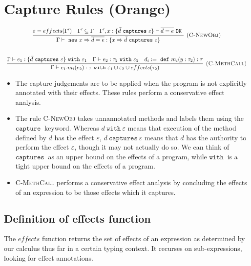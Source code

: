 \documentclass{article}
\newcommand{\keywadj}[1]{\mathtt{#1}}
\newcommand{\keyw}[1]{\keywadj{#1}~}
\begin{document}
\section{Capture Rules (Orange)}

\[
\begin{array}{c}

\infer[\textsc{(C-NewObj)}]
	{\Gamma \vdash~\keywadj{new}~x \Rightarrow \overline{d = e} : \{ x \Rightarrow \bar d~\keyw{captures} \varepsilon \} }
	{\varepsilon = effects(\Gamma') & \Gamma' \subseteq \Gamma & \Gamma', x : \{ \bar d~\keyw {captures} \varepsilon \} \vdash \overline{d = e}~\keyw{OK}} \\[5ex]

\infer[\textsc{(C-MethCall)}]
	{\Gamma \vdash e_1.m_i(e_2) : \tau~ \keyw{with} \varepsilon_1 \cup \varepsilon_2 \cup effects(\tau_2)}
	{\Gamma \vdash e_1 : \{ \bar d~\keyw{captures} \varepsilon \}~\keyw{with} \varepsilon_1 & \Gamma \vdash e_2:\tau_2~\keyw{with} \varepsilon_2&d_i :=~\keyw{def} m_i(y:\tau_2):\tau }


\end{array}
\]

\begin{itemize}
	\item The capture judgements are to be applied when the program is not explicitly annotated with their effects. These rules perform a conservative effect analysis.
	\item The rule \textsc{C-NewObj} takes unnannotated methods and labels them using the $\keyw{capture}$ keyword. Whereas $d~\keyw{with} \varepsilon$ means that execution of the method defined by $d$ has the effect $\varepsilon$, $d~\keyw{captures} \varepsilon$ means that $d$ has the authority to perform the effect $\varepsilon$, though it may not actually do so. We can think of $\keyw{captures}$ as an upper bound on the effects of a program, while $\keyw{with}$ is a tight upper bound on the effects of a program.
	\item \textsc{C-MethCall} performs a conservative effect analysis by concluding the effects of an expression to be those effects which it captures.
\end{itemize}

\subsection{Definition of effects function}

The $effects$ function returns the set of effects of an expression as determined by our calculus thus far in a certain typing context. It recurses on sub-expressions, looking for effect annotations.
\end{document}
